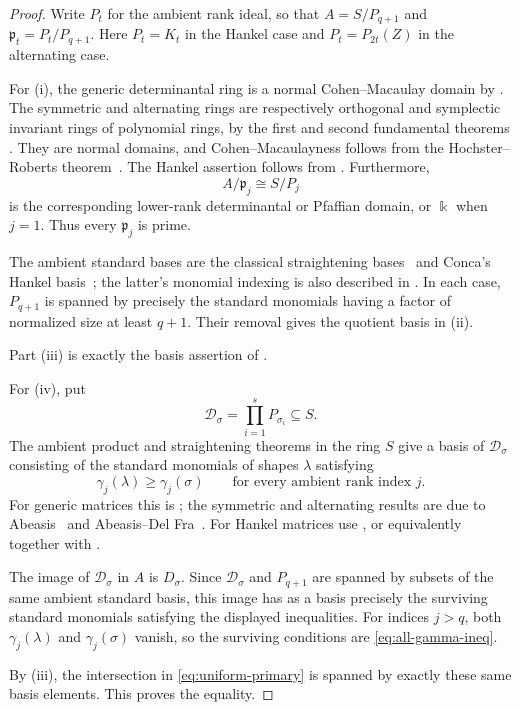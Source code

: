 \documentclass[11pt,reqno]{amsart}
\numberwithin{equation}{subsection}
\theoremstyle{definition}
\theoremstyle{remark}
\newcommand{\kfield}{\Bbbk}
\newcommand{\fp}{\mathfrak p}
\begin{document}
\begin{proof}
Write $P_t$ for the ambient rank ideal, so that
$A=S/P_{q+1}$ and $\fp_t=P_t/P_{q+1}$.
Here $P_t=K_t$ in the Hankel case and
$P_t=P_{2t}(Z)$ in the alternating case.

For (i), the generic determinantal ring is a normal
Cohen--Macaulay domain by
\cite[Corollary~5.17 and Theorem~6.3]{BrunsVetter}.
The symmetric and alternating rings are respectively
orthogonal and symplectic invariant rings of polynomial
rings, by the first and second fundamental theorems
\cite{DeConciniProcesi1976}. They are normal domains,
and Cohen--Macaulayness follows from the
Hochster--Roberts theorem~\cite{HochsterRoberts}.
The Hankel assertion follows from
\cite[Theorem~2.1]{CMSV2018}.
Furthermore,
\[
 A/\fp_j\cong S/P_j
\]
is the corresponding lower-rank determinantal or Pfaffian
domain, or $\kfield$ when $j=1$. Thus every $\fp_j$ is prime.

The ambient standard bases are the classical straightening
bases~\cite{BrunsVetter,Abeasis,AbeasisDelFra} and
Conca's Hankel basis~\cite[Theorem~1.2]{ConcaHankel};
the latter's monomial indexing is also described in
\cite[Remark~3.18]{Nam}.
In each case, $P_{q+1}$ is spanned by precisely the standard
monomials having a factor of normalized size at least $q+1$.
Their removal gives the quotient basis in (ii).

Part (iii) is exactly the basis assertion of
.

For (iv), put
\[
 \mathcal D_\sigma=\prod_{i=1}^sP_{\sigma_i}\subseteq S.
\]
The ambient product and straightening theorems in the ring $S$ give a basis of $\mathcal D_\sigma$ consisting
of the standard monomials of shapes $\lambda$ satisfying
\[
 \gamma_j(\lambda)\ge\gamma_j(\sigma)
 \qquad\text{for every ambient rank index }j.
\]
For generic matrices this is
\cite[Theorem~10.9]{BrunsVetter}; the symmetric and
alternating results are due to
Abeasis~\cite{Abeasis} and
Abeasis--Del Fra~\cite{AbeasisDelFra}.
For Hankel matrices use
\cite[Theorem~3.12]{ConcaHankel}, or equivalently
\cite[Theorem~3.25]{Nam} together with
\cite[Corollary~3.21]{Nam}.

The image of $\mathcal D_\sigma$ in $A$ is $D_\sigma$.
Since $\mathcal D_\sigma$ and $P_{q+1}$ are spanned by
subsets of the same ambient standard basis, this image
has as a basis precisely the surviving standard monomials
satisfying the displayed inequalities. For indices $j>q$,
both $\gamma_j(\lambda)$ and $\gamma_j(\sigma)$ vanish,
so the surviving conditions are
\eqref{eq:all-gamma-ineq}.

By (iii), the intersection in \eqref{eq:uniform-primary}
is spanned by exactly these same basis elements.
This proves the equality. 
\end{proof}
\end{document}
